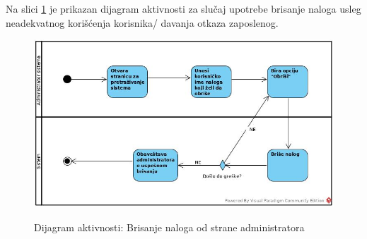 \documentclass[20pt]{article}
\begin{document}
\newpage
{}
\setlength{\parindent}{1cm}
\fontsize{13}{18} \selectfont 
Na slici \ref{fig:dijagramAktivnostiBrisanjeAdministrator} je prikazan dijagram aktivnosti za slu\v{c}aj upotrebe brisanje naloga usleg neadekvatnog kori\v {s}\' cenja korisnika/ davanja otkaza zaposlenog.

\begin{figure}[h]
		\centering
		\includegraphics[width=1.1\textwidth,height=0.60\textheight]{Pictures/BrisanjeNalogaUsledNeadekvatnogKoriscenja.jpg}\\
		\caption{Dijagram aktivnosti: Brisanje naloga od strane administratora}
		\label{fig:dijagramAktivnostiBrisanjeAdministrator}
	\end{figure}
	
\newpage
\end{document}
